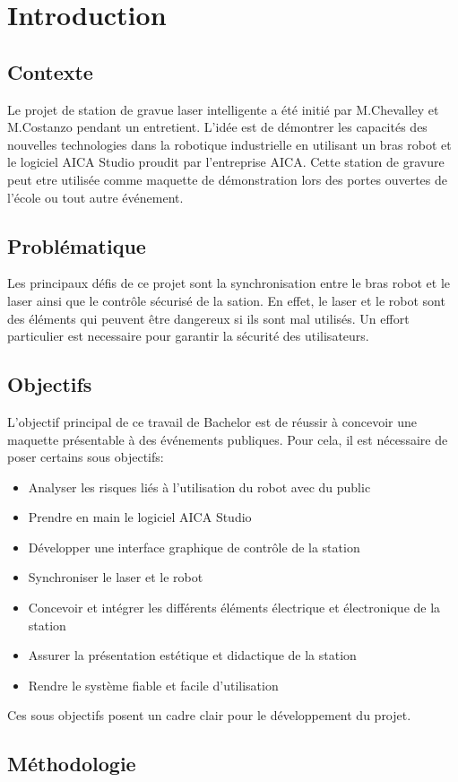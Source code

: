 \chapter{Introduction}

\section{Contexte}

Le projet de station de gravue laser intelligente a été initié par M.Chevalley et M.Costanzo pendant un entretient. L'idée est de démontrer les capacités
des nouvelles technologies dans la robotique industrielle en utilisant un bras robot et le logiciel AICA Studio proudit par l'entreprise AICA. Cette station
de gravure peut etre utilisée comme maquette de démonstration lors des portes ouvertes de l'école ou tout autre événement.

\section{Problématique}

Les principaux défis de ce projet sont la synchronisation entre le bras robot et le laser ainsi que le contrôle sécurisé de la sation. En effet, le laser et le robot
sont des éléments qui peuvent être dangereux si ils sont mal utilisés. Un effort particulier est necessaire pour garantir la sécurité des utilisateurs.

\section{Objectifs}

L'objectif principal de ce travail de Bachelor est de réussir à concevoir une maquette présentable à des événements publiques. Pour cela, il est nécessaire de poser certains
sous objectifs:

\begin{itemize}
    \item Analyser les risques liés à l'utilisation du robot avec du public
    \item Prendre en main le logiciel AICA Studio
    \item Développer une interface graphique de contrôle de la station
    \item Synchroniser le laser et le robot
    \item Concevoir et intégrer les différents éléments électrique et électronique de la station
    \item Assurer la présentation estétique et didactique de la station
    \item Rendre le système fiable et facile d'utilisation
\end{itemize}

Ces sous objectifs posent un cadre clair pour le développement du projet.


\section{Méthodologie}

